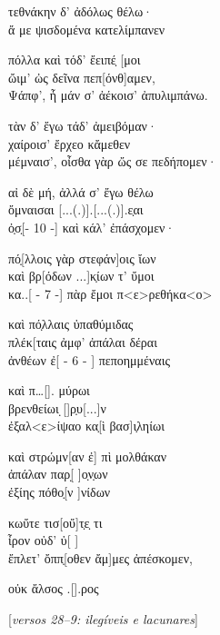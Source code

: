 \begin{gkverse}
τεθνάκην δ’ ἀδόλως θέλω·\\
ἄ με ψισδομένα κατελίμπανεν

πόλλα καὶ τόδ’ ἔειπέ̣  [μοι\\
ὤιμ’ ὠς δεῖνα πεπ[όνθ]αμεν,\\
Ψάπφ’, ἦ μάν σ’ ἀέκοισ’ ἀπυλιμπάνω.

τὰν δ’ ἔγω τάδ’ ἀμειβόμαν·\\
χαίροισ’ ἔρχεο κἄμεθεν\\
μέμναισ’, οἶσθα γὰρ ὤς σε πεδήπομεν·

αἰ δὲ μή, ἀλλά σ’ ἔγω θέλω\\
ὄμναισαι [...(.)].[...(.)].ε̣αι\\
ὀ̣σ̣[\qquad     - 10 -\qquad   ] καὶ κάλ’ ἐπάσχομεν·

πό̣[λλοις γὰρ στεφάν]οις ἴων\\
καὶ βρ[όδων ...]κ̣ίων τ’ ὔμοι\\
κα..[ - 7 -\quad   ] πὰρ ἔμοι π<ε>ρεθήκα<ο>

καὶ πό̣λλαις ὐπαθύμιδας\\
πλέκ[ταις ἀμφ’ ἀπάλαι δέραι\\
ἀνθέων ἐ[  -  6  -  ] πεποημμέναις

καὶ π\ldots{}[\qquad      ]. μύρωι\\
βρενθείωι ̣[\qquad      ]ρ̣υ[...]ν\\
ἐξαλ<ε>ίψαο κα̣[ὶ βασ]ι̣ληίωι

καὶ στρώμν[αν ἐ] πὶ μολθάκαν\\
ἀπάλαν παρ[̣ \quad   ]ο̣ν̣ων\\ 
ἐξίης πόθο̣[ν \quad    ]νίδων

κωὔτε τισ[\quad       οὔ]τ̣ε̣ τι\\
ἶρον οὐδ’ ὐ[ \quad        ]\\
ἔπλετ’ ὄππ̣[οθεν ἄμ]μες ἀπέσκομεν,

οὐκ ἄλσος .[\qquad	       ].ρος

\textnormal{[\textit{versos 28--9: ilegíveis e lacunares}]}
\end{gkverse}

\pagebreak

